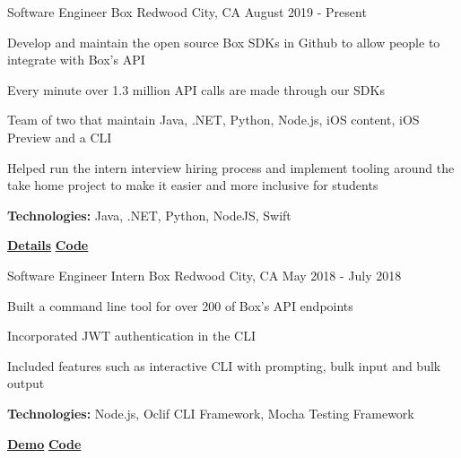 
\begin{cventries}
  \cventry
    {Software Engineer} %
    {Box} %
    {Redwood City, CA} %
    {August 2019 - Present} %
    {
      \begin{cvitems} %
        \item{Develop and maintain the open source Box SDKs in Github to allow people to integrate with Box's API}
        \item{Every minute over 1.3 million API calls are made through our SDKs}
        \item{Team of two that maintain Java, .NET, Python, Node.js, iOS content, iOS Preview and a CLI}
        \item{Helped run the intern interview hiring process and implement tooling around the take home project to make it easier and more inclusive for students }
        {\setlength \itemindent{-2ex} \itemsep2pt \item[] \textbf{Technologies:} Java, .NET, Python, NodeJS, Swift}
        {\setlength \itemindent{-2ex} \itemsep2pt \item[] 
        \href{https://sujaygarlanka.com/\#!experience-box}{ \faInfoCircle \textbf{ Details}}
        \href{https://github.com/box/sdks}{ \faGithub \textbf{ Code}}}
      \end{cvitems}
    }
    
  \cventry
    {Software Engineer Intern} %
    {Box} %
    {Redwood City, CA} %
    {May 2018 - July 2018} %
    {
      \begin{cvitems} %
        \item{Built a command line tool for over 200 of Box’s API endpoints}
        \item{Incorporated JWT authentication in the CLI}
        \item{Included features such as interactive CLI with prompting, bulk input and bulk output}
        {\setlength \itemindent{-2ex} \itemsep2pt \item[] \textbf{Technologies:} Node.js, Oclif CLI Framework, Mocha Testing Framework}
        {\setlength \itemindent{-2ex} \itemsep2pt \item[]  \href{https://sujaygarlanka.com/\#!experience-internship}{ \faPlayCircle \textbf{ Demo}} \href{https://github.com/box/boxcli}{ \faGithub \textbf{ Code}}}
      \end{cvitems}
    }


\end{cventries}
